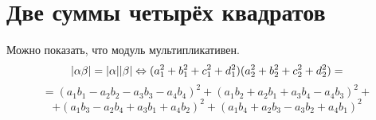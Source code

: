 \section{Две суммы четырёх квадратов}

Можно показать, что модуль мультипликативен.
$$|\alpha \beta| = |\alpha||\beta| \Leftrightarrow (a_1^2+b_1^2+c_1^2+d_1^2)(a_2^2+b_2^2+c_2^2+d_2^2) = $$
$$ = (a_1 b_1-a_2 b_2 - a_3 b_3 - a_4 b_4)^2 + (a_1 b_2 + a_2 b_1 + a_3 b_4 - a_4 b_3)^2 + $$
$$+ (a_1 b_3 - a_2 b_4 + a_3 b_1 + a_4 b_2)^2 + (a_1 b_4 + a_2 b_3 - a_3 b_2 + a_4 b_1)^2$$